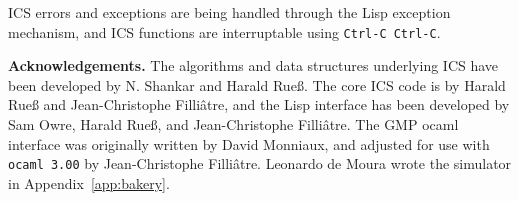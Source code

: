 \documentclass[12pt]{article}
\begin{document}
ICS errors and exceptions are being handled through the Lisp
exception mechanism, and ICS functions are interruptable using
{\tt Ctrl-C Ctrl-C}\@.









\vspace{10mm}
{\bf Acknowledgements.}
The algorithms and data structures underlying ICS have been
developed by N. Shankar and Harald Rue{\ss}\@. The core ICS code is
by Harald Rue{\ss} and Jean-Christophe Filli{\^a}tre, and the Lisp
interface has been developed by Sam Owre, Harald Rue{\ss}, and
Jean-Christophe Filli{\^a}tre. The GMP ocaml interface was originally
written by David Monniaux, and adjusted for use with \texttt{ocaml 3.00} by
Jean-Christophe Filli{\^a}tre. Leonardo de Moura wrote the simulator
in Appendix~\ref{app:bakery}\@.
\end{document}
